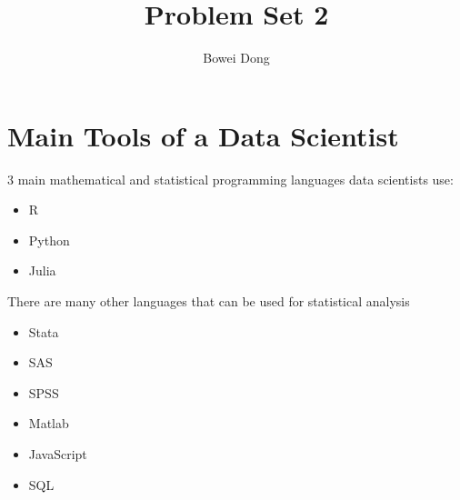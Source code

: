 \documentclass{article}
\title{Problem Set 2}
\author{Bowei Dong }
\date{}
\begin{document}
\maketitle

\section*{Main Tools
of a Data Scientist}

3 main mathematical and statistical programming languages data scientists use:
\begin{itemize}
    \item R
    \item Python
    \item Julia
\end{itemize}

There are many other languages that can be used for statistical analysis
\begin{itemize}
    \item Stata
    \item SAS
    \item SPSS
    \item Matlab
    \item JavaScript
    \item SQL
\end{itemize}
\end{document}
